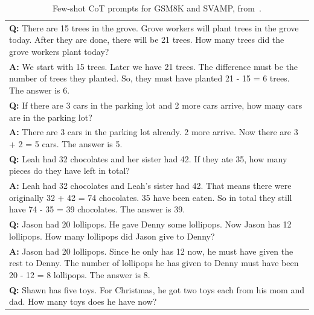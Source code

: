 \begin{table}[h]
    \caption{
    Few-shot CoT prompts for GSM8K and SVAMP, from~\cite{Wei2022ChainOT}.
    }
    \centering
    \small
    \begin{tabular}{p{13.5cm}}
        \toprule
        \textbf{Q:} There are 15 trees in the grove. Grove workers will plant trees in the grove today. After they are done, there will be 21 trees. How many trees did the grove workers plant today? \\
        \vspace{-1mm}
        \textbf{A:} We start with 15 trees. Later we have 21 trees. The difference must be the number of trees they planted. So, they must have planted 21 - 15 = 6 trees. The answer is 6. \\
        \vspace{0mm}
        \textbf{Q:} If there are 3 cars in the parking lot and 2 more cars arrive, how many cars are in the parking lot? \\
        \vspace{-1mm}
        \textbf{A:} There are 3 cars in the parking lot already. 2 more arrive. Now there are 3 + 2 = 5 cars. The answer is 5. \\
        \vspace{0mm}
        \textbf{Q:} Leah had 32 chocolates and her sister had 42. If they ate 35, how many pieces do they have left in total? \\
        \vspace{-1mm}
        \textbf{A:} Leah had 32 chocolates and Leah's sister had 42. That means there were originally 32 + 42 = 74 chocolates. 35 have been eaten. So in total they still have 74 - 35 = 39 chocolates. The answer is 39. \\
        \vspace{0mm}
        \textbf{Q:} Jason had 20 lollipops. He gave Denny some lollipops. Now Jason has 12 lollipops. How many lollipops did Jason give to Denny? \\
        \vspace{-1mm}
        \textbf{A:} Jason had 20 lollipops. Since he only has 12 now, he must have given the rest to Denny. The number of lollipops he has given to Denny must have been 20 - 12 = 8 lollipops. The answer is 8. \\
        \vspace{0mm}
        \textbf{Q:} Shawn has five toys. For Christmas, he got two toys each from his mom and dad. How many toys does he have now? \\

\end{tabular}
\end{table}
